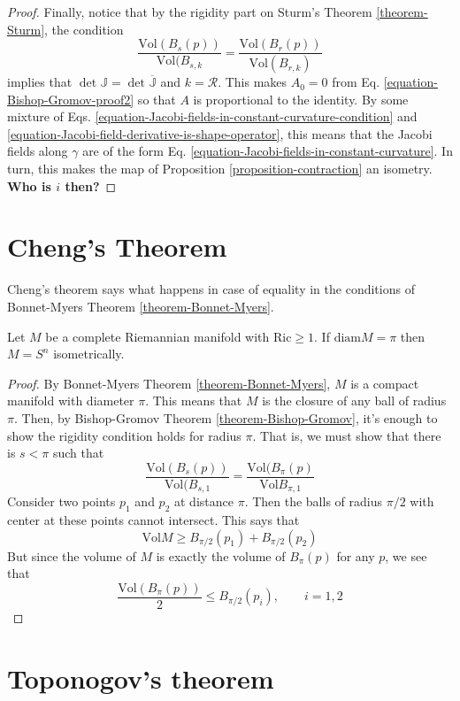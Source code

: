 \begin{proof}
Finally, notice that by the rigidity part on Sturm's Theorem
\ref{theorem-Sturm}, the condition
$$
\frac{\text{Vol}(B_s(p))}{\text{Vol}(B_{s,k}}=
\frac{\text{Vol}(B_r(p))}{\text{Vol}(B_{r,k})}
$$
implies that $\det\mathbb{J}=\det\overline{\mathbb{J}}$ and $k=\mathcal{R}$.
This makes $A_0=0$ from Eq. \ref{equation-Bishop-Gromov-proof2} so that $A$ is 
proportional to the identity. By some mixture
of Eqs. \ref{equation-Jacobi-fields-in-constant-curvature-condition} and 
\ref{equation-Jacobi-field-derivative-is-shape-operator}, this means that the
Jacobi fields along $\gamma$ are of the form Eq.
\ref{equation-Jacobi-fields-in-constant-curvature}. In turn, this makes the map
of Proposition \ref{proposition-contraction} an isometry. {\bf Who is $i$ then?}
\end{proof}

\section{Cheng's Theorem}
\label{section-Cheng-theorem}

Cheng's theorem says what happens in case of equality in the conditions of 
Bonnet-Myers Theorem \ref{theorem-Bonnet-Myers}.
\begin{theorem}[Cheng]
\label{theorem-Cheng}
Let $M$ be a complete Riemannian manifold with $\text{Ric}\geq 1$. If 
$\text{diam}M=\pi$ then $M=S^n$ isometrically.
\end{theorem}

\begin{proof}
By Bonnet-Myers Theorem \ref{theorem-Bonnet-Myers}, $M$ is a compact manifold
with diameter $\pi$. This means that $M$ is the closure of any ball of radius
$\pi$. Then, by Bishop-Gromov Theorem \ref{theorem-Bishop-Gromov}, it's enough 
to show the rigidity condition holds for radius $\pi$. That is, we must show
that there is $s<\pi$ such that
$$
\frac{\text{Vol}(B_s(p))}{\text{Vol}(B_{s,1}}= 
\frac{\text{Vol}(B_\pi(p)}{\text{Vol}B_{\pi,1}}
$$
Consider two points $p_1$ and $p_2$ at distance $\pi$. Then the balls of radius
$\pi/2$ with center at these points cannot intersect. This says that
$$
\text{Vol}M\geq B_{\pi/2}(p_1)+B_{\pi/2}(p_2)
$$
But since the volume of $M$ is exactly the volume of $B_\pi(p)$ for any $p$, we
see that
$$
\frac{\text{Vol}(B_\pi(p))}{2}\leq B_{\pi/2}(p_i),\qquad i=1,2
$$
\end{proof}

\section{Toponogov's theorem}
\label{section-Toponogov}

